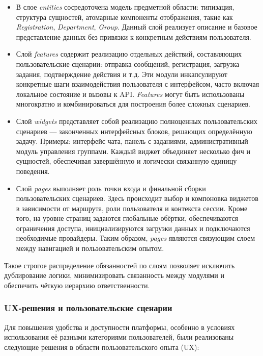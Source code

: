 \begin{itemize}
  	\item В слое \textit{entities} сосредоточена модель предметной области: типизация, структура сущностей, атомарные компоненты отображения, такие как \textit{Registration}, \textit{Department}, \textit{Group}. Данный слой реализует описание и базовое представление данных без привязки к конкретным действиям пользователя.
  
	\item Слой \textit{features} содержит реализацию отдельных действий, составляющих пользовательские сценарии: отправка сообщений, регистрация, загрузка задания, подтверждение действия и т.д. Эти модули инкапсулируют конкретные шаги взаимодействия пользователя с интерфейсом, часто включая локальное состояние и вызовы к API. \textit{Features} могут быть использованы многократно и комбинироваться для построения более сложных сценариев.
	
	\item Слой \textit{widgets} представляет собой реализацию полноценных пользовательских сценариев — законченных интерфейсных блоков, решающих определённую задачу. Примеры: интерфейс чата, панель с заданиями, административный модуль управления группами. Каждый виджет объединяет несколько фич и сущностей, обеспечивая завершённую и логически связанную единицу поведения.
	
	\item Слой \textit{pages} выполняет роль точки входа и финальной сборки пользовательских сценариев. Здесь происходит выбор и компоновка виджетов в зависимости от маршрута, роли пользователя и контекста сессии. Кроме того, на уровне страниц задаются глобальные обёртки, обеспечиваются ограничения доступа, инициализируются загрузки данных и подключаются необходимые провайдеры. Таким образом, \textit{pages} являются связующим слоем между навигацией и пользовательским опытом.
\end{itemize}

Такое строгое распределение обязанностей по слоям позволяет исключить дублирование логики, минимизировать связанность между модулями и обеспечить чёткую иерархию ответственности.

\subsubsection{UX-решения и пользовательские сценарии}

Для повышения удобства и доступности платформы, особенно в условиях использования её разными категориями пользователей, были реализованы следующие решения в области пользовательского опыта (UX):

